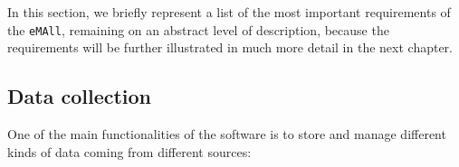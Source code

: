 In this section, we briefly represent a list of the most important requirements of the \verb|eMAll|, remaining on an abstract level of description, because the requirements will be further illustrated in much more detail in the next chapter. 

\subsection{Data collection}
One of the main functionalities of the software is to store and manage different kinds of data coming from different sources:

